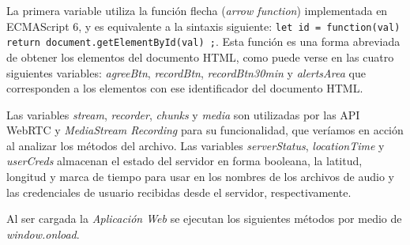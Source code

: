 La primera variable utiliza la función flecha (\emph{arrow function}) implementada en ECMAScript 6, y es equivalente a la sintaxis siguiente: \texttt{let id = function(val) { return document.getElementById(val) };}. Esta función es una forma abreviada de obtener los elementos del documento HTML, como puede verse en las cuatro siguientes variables: \emph{agreeBtn}, \emph{recordBtn}, \emph{recordBtn30min} y \emph{alertsArea} que corresponden a los elementos con ese identificador del documento HTML.

Las variables \emph{stream}, \emph{recorder}, \emph{chunks} y \emph{media} son utilizadas por las API WebRTC y \emph{MediaStream Recording} para su funcionalidad, que veríamos en acción al analizar los métodos del archivo. Las variables \emph{serverStatus}, \emph{locationTime} y \emph{userCreds} almacenan el estado del servidor en forma booleana, la latitud, longitud y marca de tiempo para usar en los nombres de los archivos de audio y las credenciales de usuario recibidas desde el servidor, respectivamente.

Al ser cargada la \emph{Aplicación Web} se ejecutan los siguientes métodos por medio de \emph{window.onload}.



